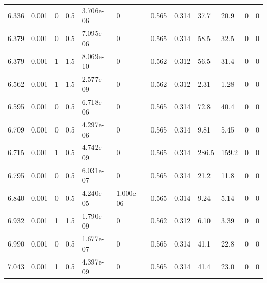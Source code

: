 \documentclass[preview]{standalone}
\begin{document}
{{{\begin{tabular}{L{1.2cm}C{1.2cm} C{0.3cm}C{0.5cm} C{1.4cm}C{1.4cm} C{1.4cm}C{1.4cm} C{1.6cm}C{1.6cm} C{1.6cm}C{1.6cm}}
  6.336  &  0.001  & 0     & 0.5 &  3.706e-06  & 0  &  0.565&   0.314& 37.7 & 20.9   &  0 & 0  \\ 
  6.379  &  0.001  & 0     & 0.5 &  7.095e-06  & 0  &  0.565&   0.314& 58.5 & 32.5   &  0 & 0  \\ 
  6.379  &  0.001  & 1     & 1.5 &  8.069e-10  & 0  &  0.562&   0.312& 56.5 & 31.4   &  0 & 0  \\ 
  6.562  &  0.001  & 1     & 1.5 &  2.577e-09  & 0  &  0.562&   0.312& 2.31 & 1.28   &  0 & 0  \\ 
  6.595  &  0.001  & 0     & 0.5 &  6.718e-06  & 0  &  0.565&   0.314& 72.8 & 40.4   &  0 & 0  \\ 
  6.709  &  0.001  & 0     & 0.5 &  4.297e-06  & 0  &  0.565&   0.314& 9.81 & 5.45   &  0 & 0  \\ 
  6.715  &  0.001  & 1     & 0.5 &  4.742e-09  & 0  &  0.565&   0.314& 286.5 & 159.2   &  0 & 0  \\ 
  6.795  &  0.001  & 0     & 0.5 &  6.031e-07  & 0  &  0.565&   0.314& 21.2 & 11.8   &  0 & 0  \\ 
  6.840  &  0.001  & 0     & 0.5 &  4.240e-05  & 1.000e-06  &  0.565&   0.314& 9.24 & 5.14   &  0 & 0  \\ 
  6.932  &  0.001  & 1     & 1.5 &  1.790e-09  & 0  &  0.562&   0.312& 6.10 & 3.39   &  0 & 0  \\ 
  6.990  &  0.001  & 0     & 0.5 &  1.677e-07  & 0  &  0.565&   0.314& 41.1 & 22.8   &  0 & 0  \\ 
  7.043  &  0.001  & 1     & 0.5 &  4.397e-09  & 0  &  0.565&   0.314& 41.4 & 23.0   &  0 & 0  \\ 
\hline 
\end{tabular} 

}}}
\end{document}
